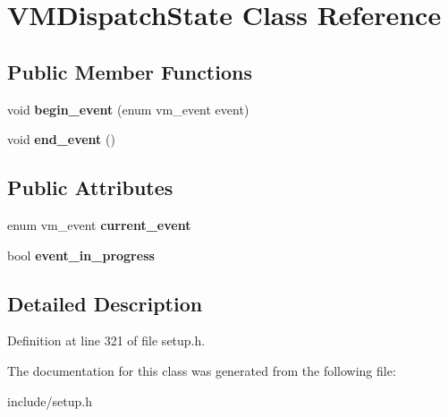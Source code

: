 \hypertarget{classVMDispatchState}{\section{V\-M\-Dispatch\-State Class Reference}
\label{classVMDispatchState}
}
\subsection*{Public Member Functions}
\begin{DoxyCompactItemize}
\item 
\hypertarget{classVMDispatchState_a3a0362f365280487cf9d34390ed0b2dc}{void {\bfseries begin\-\_\-event} (enum vm\-\_\-event event)}\label{classVMDispatchState_a3a0362f365280487cf9d34390ed0b2dc}

\item 
\hypertarget{classVMDispatchState_ac8a6709d68dbc4bf1a460292d52beab0}{void {\bfseries end\-\_\-event} ()}\label{classVMDispatchState_ac8a6709d68dbc4bf1a460292d52beab0}

\end{DoxyCompactItemize}
\subsection*{Public Attributes}
\begin{DoxyCompactItemize}
\item 
\hypertarget{classVMDispatchState_a0a92ac377b1d3e68d8dd3af2c8c433ba}{enum vm\-\_\-event {\bfseries current\-\_\-event}}\label{classVMDispatchState_a0a92ac377b1d3e68d8dd3af2c8c433ba}

\item 
\hypertarget{classVMDispatchState_a46c3a4522f352e7da32a6553fd27a471}{bool {\bfseries event\-\_\-in\-\_\-progress}}\label{classVMDispatchState_a46c3a4522f352e7da32a6553fd27a471}

\end{DoxyCompactItemize}


\subsection{Detailed Description}


Definition at line 321 of file setup.\-h.



The documentation for this class was generated from the following file\-:\begin{DoxyCompactItemize}
\item 
include/setup.\-h\end{DoxyCompactItemize}

